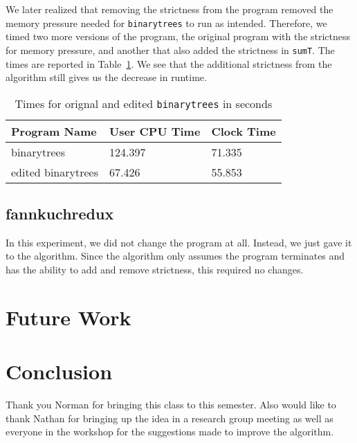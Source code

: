 \documentclass{sigplanconf}
\begin{document}
We later realized that removing the strictness from the program removed the memory pressure needed for \lstinline!binarytrees! to run as intended. Therefore, we timed two more versions of the program, the original program with the strictness for memory pressure, and another that also added the strictness in \lstinline!sumT!. The times are reported in Table~\ref{tab:btree}. We see that the additional strictness from the algorithm still gives us the decrease in runtime.
\begin{table}[t]
\label{tab:btree}
\begin{tabular}{| l | l | l |}
\hline
Program Name & User CPU Time & Clock Time\\
\hline
binarytrees & 124.397 & 71.335\\
\hline
edited binarytrees & 67.426 & 55.853\\
\hline
\end{tabular}
\caption{Times for orignal and edited \lstinline!binarytrees! in seconds}
\end{table}
\subsection{fannkuchredux}
In this experiment, we did not change the program at all. Instead, we just gave it to the algorithm. Since the algorithm only assumes the program terminates and has the ability to add and remove strictness, this required no changes.
\section{Future Work}\label{sec:futr}

\section{Conclusion}\label{sec:conc}

%

\acks

Thank you Norman for bringing this class to this semester. Also would like to thank Nathan for bringing up the idea in a research group meeting as well as everyone in the workshop for the suggestions made to improve the algorithm.

\end{document}
